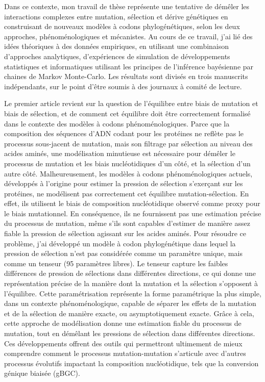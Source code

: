 Dans ce contexte, mon travail de thèse représente une tentative de démêler les interactions complexes entre mutation, sélection et dérive génétiques en construisant de nouveaux modèles à codons phylogénétiques, selon les deux approches, phénoménologiques et mécanistes.
Au cours de ce travail, j'ai lié des idées théoriques à des données empiriques, en utilisant une combinaison d'approches analytiques, d'expériences de simulation de développements statistiques et informatiques utilisant les principes de l’inférence bayésienne par chaines de Markov Monte-Carlo.
Les résultats sont divisés en trois manuscrits indépendants, sur le point d'être soumis à des journaux à comité de lecture.

\newpage
Le premier article revient sur la question de l'équilibre entre biais de mutation et biais de sélection, et de comment cet équilibre doit être correctement formalisé dans le contexte des modèles à codons phénoménologiques.
Parce que la composition des séquences d'ADN codant pour les protéines ne reflète pas le processus sous-jacent de mutation, mais son filtrage par sélection au niveau des acides aminés, une modélisation minutieuse est nécessaire pour démêler le processus de mutation et les biais nucléotidiques d'un côté, et la sélection d'un autre côté.
Malheureusement, les modèles à codons phénoménologiques actuels, développés à l'origine pour estimer la pression de sélection s’exerçant sur les protéines, ne modélisent pas correctement cet équilibre mutation-sélection.
En effet, ils utilisent le biais de composition nucléotidique observé comme proxy pour le biais mutationnel.
En conséquence, ils ne fournissent pas une estimation précise du processus de mutation, même s'ils sont capables d'estimer de manière assez fiable la pression de sélection agissant sur les acides aminés.
Pour résoudre ce problème, j'ai développé un modèle à codon phylogénétique dans lequel la pression de sélection n'est pas considérée comme un paramètre unique, mais comme un tenseur (95 paramètres libres).
Le tenseur capture les faibles différences de pression de sélections dans différentes directions, ce qui donne une représentation précise de la manière dont la mutation et la sélection s'opposent à l'équilibre.
Cette paramétrisation représente la forme paramétrique la plus simple, dans un contexte phénoménologique, capable de séparer les effets de la mutation et de la sélection de manière exacte, ou asymptotiquement exacte.
Grâce à cela, cette approche de modélisation donne une estimation fiable du processus de mutation, tout en démêlant les pressions de sélection dans différentes directions.
Ces développements offrent des outils qui permettront ultimement de mieux comprendre comment le processus mutation-mutation s’articule avec d'autres processus évolutifs impactant la composition nucléotidique, tels que la conversion génique biaisée (gBGC).

